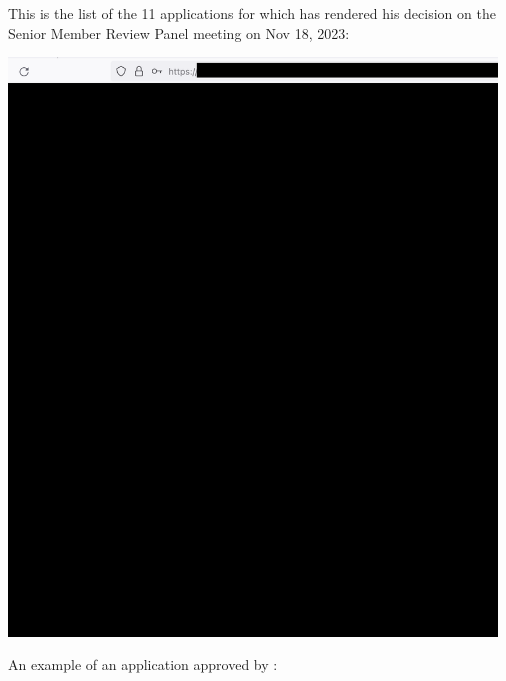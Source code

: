 
This is the list of the 11 applications for which \mrl has rendered his decision
on the Senior Member Review Panel meeting on Nov 18, 2023:

\begin{center}
    \includegraphics[width=35em]{applications_public}
\end{center}
\pagebreak

An example of an application approved by \mrl:

